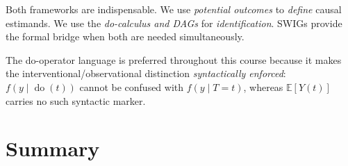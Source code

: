 \documentclass[
  a4paper,
]{book}
\newcommand{\doop}{\operatorname{do}}
\newcommand{\E}{\mathbb{E}}
\begin{document}
\begin{tcolorbox}[enhanced jigsaw, arc=.35mm, bottomrule=.15mm, bottomtitle=1mm, breakable, colback=white, colbacktitle=quarto-callout-note-color!10!white, colframe=quarto-callout-note-color-frame, coltitle=black, left=2mm, leftrule=.75mm, opacityback=0, opacitybacktitle=0.6, rightrule=.15mm, title={Our Position in This Course}, titlerule=0mm, toprule=.15mm, toptitle=1mm]

Both frameworks are indispensable. We use \emph{potential outcomes} to
\emph{define} causal estimands. We use the \emph{do-calculus and DAGs}
for \emph{identification}. SWIGs provide the formal bridge when both are
needed simultaneously.

The do-operator language is preferred throughout this course because it
makes the interventional/observational distinction \emph{syntactically
enforced}: \(f(y \mid \doop(t))\) cannot be confused with
\(f(y \mid T{=}t)\), whereas \(\E[Y(t)]\) carries no such syntactic
marker.

\end{tcolorbox}

\section{Summary}\label{summary-3}
\end{document}
